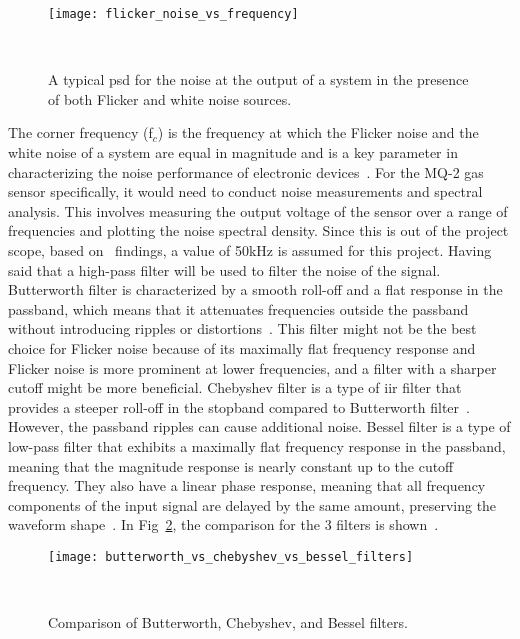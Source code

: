 \begin{figure}[ht]
    \centering\texttt{[image: flicker\_noise\_vs\_frequency]}
    \caption{A typical \acrshort{psd} for the noise at the output of a system in the presence of both Flicker and white noise sources.}
~\label{fig:flicker_noise_vs_frequency}
\end{figure}

The corner frequency (f$_{c}$) is the frequency at which the Flicker noise and the white noise of a system are equal in magnitude and is a key parameter in characterizing the noise performance of electronic devices~\cite{smulko_2024}. For the MQ-2 gas sensor specifically, it would need to conduct noise measurements and spectral analysis. This involves measuring the output voltage of the sensor over a range of frequencies and plotting the noise spectral density. Since this is out of the project scope, based on~\cite{smulko_2024} findings, a value of 50kHz is assumed for this project. Having said that a high-pass filter will be used to filter the noise of the signal. \\

Butterworth filter is characterized by a smooth roll-off and a flat response in the passband, which means that it attenuates frequencies outside the passband without introducing ripples or distortions~\cite{ruofei_2021}. This filter might not be the best choice for Flicker noise because of its maximally flat frequency response and Flicker noise is more prominent at lower frequencies, and a filter with a sharper cutoff might be more beneficial. Chebyshev filter is a type of \acrfull{iir} filter that provides a steeper roll-off in the stopband compared to Butterworth filter~\cite{podder_2014}. However, the passband ripples can cause additional noise. Bessel filter is a type of low-pass filter that exhibits a maximally flat frequency response in the passband, meaning that the magnitude response is nearly constant up to the cutoff frequency. They also have a linear phase response, meaning that all frequency components of the input signal are delayed by the same amount, preserving the waveform shape~\cite{ashu_2021}. In Fig~\ref{fig:butterworth_vs_chebyshev_vs_bessel_filters}, the comparison for the 3 filters is shown~\cite{kikkert_2008}. \\

\begin{figure}[ht]
    \centering\texttt{[image: butterworth\_vs\_chebyshev\_vs\_bessel\_filters]}
    \caption{Comparison of Butterworth, Chebyshev, and Bessel filters.}
~\label{fig:butterworth_vs_chebyshev_vs_bessel_filters}
\end{figure}

